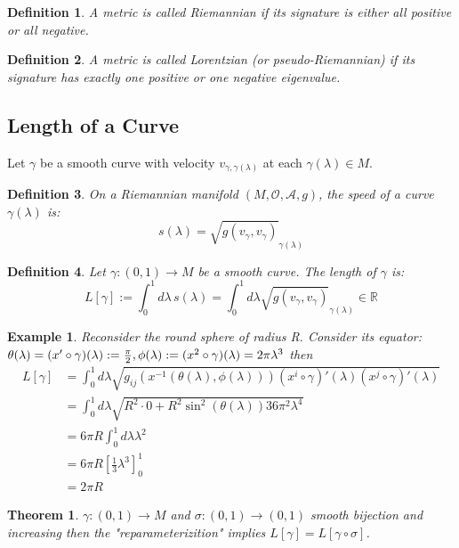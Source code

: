 \documentclass[10pt, oneside]{article}
\newcommand{\R}{\mathbb{R}}
\newtheorem{thm}{Theorem}
\newtheorem{defn}{Definition}
\newtheorem{example}{Example}
\begin{document}
\begin{defn}
A metric is called \emph{Riemannian} if its signature is either all positive or all negative.
\end{defn}


\begin{defn}
A metric is called \emph{Lorentzian} (or pseudo-Riemannian) if its signature has exactly one positive or one negative eigenvalue.
\end{defn}


\subsection{Length of a Curve}
Let $\gamma$ be a smooth curve with velocity $v_{\gamma, \gamma(\lambda)}$ at each $\gamma(\lambda) \in M$.


\begin{defn}
On a Riemannian manifold $(M, \mathcal{O},\mathcal{A},g)$, the speed of a curve $\gamma(\lambda)$ is:
\[ s(\lambda) = \sqrt{g(v_{\gamma},v_{\gamma})}_{\gamma (\lambda)}
\]
\end{defn}


\begin{defn}
Let $\gamma\colon (0,1) \to M$ be a smooth curve. The length of $\gamma$ is:
\[ L[\gamma] := \int_{0}^{1} d\lambda\, s(\lambda) = \int_{0}^{1} d\lambda \sqrt{g(v_{\gamma},v_{\gamma})}_{\gamma (\lambda)} \in \R
\]
\end{defn}
\begin{example}
Reconsider the round sphere of radius R. Consider its equator: $\theta(\lambda) = (x' \circ \gamma)(\lambda) := \frac{\pi}{2}, \phi (\lambda) := (x^2 \circ \gamma)(\lambda) = 2 \pi \lambda^3 \\$
then
\begin{align*}
L[\gamma] &= \int_{0}^{1}d \lambda \sqrt{g_{ij} (x^{-1}(\theta(\lambda),\phi(\lambda)))(x^i \circ \gamma)' (\lambda)(x^j \circ \gamma)'(\lambda)} \\
&= \int_{0}^{1} d \lambda \sqrt{R^2 \cdot 0 + R^2 \sin^2(\theta(\lambda)) 36 \pi^2 \lambda^4}\\
&= 6 \pi R \int_{0}^{1}d \lambda \lambda^2 \\
&= 6 \pi R[\frac{1}{3} \lambda^3]^{1}_{0} \\
&= 2 \pi R
\end{align*}
\end{example}
\begin{thm}
$\gamma: (0,1) \to M$ and $\sigma: (0,1) \to (0,1)$ smooth bijection and increasing then the "reparameterizition" implies $L[\gamma] = L[\gamma \circ \sigma]$.
\end{thm}
\end{document}
